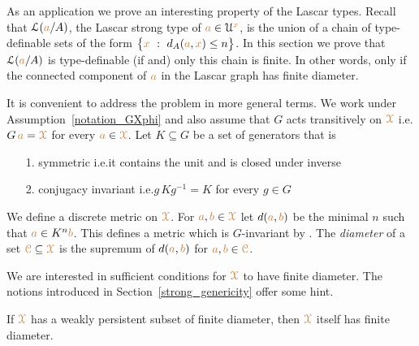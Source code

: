 As an application we prove an interesting property of the Lascar types.
Recall that $\EuScript L({\color{brown} a}/A)$, the Lascar strong type of ${\color{brown} a}\in\EuScript U^{\color{brown} x}$, is the union of a chain of type-definable sets of the form $\big\{{\color{brown} x}\ :\ d_A({\color{brown} a},{\color{brown} x})\le n\big\}$.
In this section we prove that $\EuScript L({\color{brown} a}/A)$ is type-definable (if and) only this chain is finite.
In other words, only if the connected component of ${\color{brown} a}$ in the Lascar graph has finite diameter.

It is convenient to address the problem in more general terms.
We work under Assumption~\ref{notation_GXphi} and also assume that $G$ acts transitively on ${\color{brown}\EuScript X}$ i.e.\@ $G\,{\color{brown} a}={\color{brown}\EuScript X}$ for every ${\color{brown} a}\in{\color{brown}\EuScript X}$.
Let $K\subseteq G$ be a set of generators that is
\begin{itemize}
  \item[1.] symmetric i.e.\@ it contains the unit and is closed under inverse
  \item[2.] conjugacy invariant i.e.\@ $g\,Kg^{-1}=K$ for every $g\in G$
\end{itemize}

We define a discrete metric on ${\color{brown}\EuScript X}$.
For ${\color{brown} a},{\color{brown} b}\in{\color{brown}\EuScript X}$ let $d({\color{brown} a},{\color{brown} b})$ be the minimal $n$ such that ${\color{brown} a}\in K^n{\color{brown} b}$.
This defines a metric which is $G$-invariant by .
The \emph{diameter\/} of a set ${\color{brown}\EuScript C}\subseteq{\color{brown}\EuScript X}$ is the supremum of $d({\color{brown} a},{\color{brown} b})$ for ${\color{brown} a},{\color{brown} b}\in{\color{brown}\EuScript C}$.

We are interested in sufficient conditions for ${\color{brown}\EuScript X}$ to have finite diameter.
The notions introduced in Section~\ref{strong_genericity} offer some hint.

\begin{proposition}\label{prop_wpers_finite_diameter}
  If ${\color{brown}\EuScript X}$ has a weakly persistent subset of finite diameter, then ${\color{brown}\EuScript X}$ itself has finite diameter.
\end{proposition}

